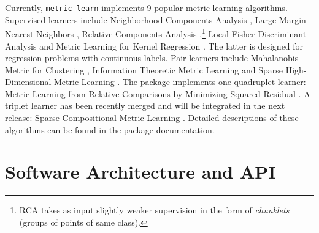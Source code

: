 \documentclass[twoside,11pt]{article}
\begin{document}
Currently, \texttt{metric-learn} implements 9 popular metric learning algorithms.
Supervised learners include Neighborhood Components Analysis \citep[NCA,][]{Goldberger04}, Large Margin Nearest Neighbors \citep[LMNN,][]{Weinberger09}, Relative Components Analysis \citep[RCA,][]{Shental02},\footnote{RCA takes as input slightly weaker supervision in the form of \emph{chunklets} (groups of points of same class).} Local Fisher Discriminant Analysis \citep[LFDA,][]{Sugiyama07} and Metric Learning for Kernel Regression \citep[MLKR,][]{Weinberger07}.
The latter is designed for regression problems with continuous labels.
Pair learners include Mahalanobis Metric for Clustering \citep[MMC,][]{Xing2002a}, Information Theoretic Metric Learning \citep[ITML,][]{Davis07} and Sparse High-Dimensional Metric Learning \citep[SDML,][]{Qi09}.
The package implements one quadruplet learner: Metric Learning from Relative Comparisons by Minimizing Squared Residual \citep[LSML,][]{Liu12}. A triplet learner has been recently merged and will be integrated in the next release: Sparse Compositional Metric Learning \citep[SCML,][]{Shi15}.
Detailed descriptions of these algorithms can be found in the package documentation.

\section{Software Architecture and API}
\end{document}
